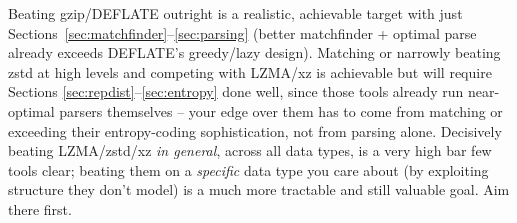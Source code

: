 \documentclass[11pt]{article}
\begin{document}
\begin{tcolorbox}[colback=yellow!5!white,colframe=yellow!75!black,title=Honest expectation setting]
Beating gzip/DEFLATE outright is a realistic, achievable target with just
Sections~\ref{sec:matchfinder}--\ref{sec:parsing} (better matchfinder + optimal parse
already exceeds DEFLATE's greedy/lazy design). Matching or narrowly beating zstd at high
levels and competing with LZMA/xz is achievable but will require Sections
\ref{sec:repdist}--\ref{sec:entropy} done well, since those tools already run
near-optimal parsers themselves -- your edge over them has to come from matching or
exceeding their entropy-coding sophistication, not from parsing alone. Decisively
beating LZMA/zstd/xz \emph{in general}, across all data types, is a very high bar few
tools clear; beating them on a \emph{specific} data type you care about (by exploiting
structure they don't model) is a much more tractable and still valuable goal. Aim
there first.
\end{tcolorbox}
\end{document}
